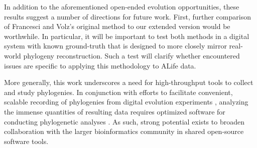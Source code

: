 In addition to the aforementioned open-ended evolution opportunities, these results suggest a number of directions for future work.
First, further comparison of Francesci and Volz's original method to our extended version would be worthwhile.
In particular, it will be important to test both methods in a digital system with known ground-truth that is designed to more closely mirror real-world phylogeny reconstruction.
Such a test will clarify whether encountered issues are specific to applying this methodology to ALife data.

More generally, this work underscores a need for high-throughput tools to collect and study phylogenies.
In conjunction with efforts to facilitate convenient, scalable recording of phylogenies from digital evolution experiments \citep{dolson2024phylotrack,lalejini2019data,moreno2022hstrat,godin-duboisAPOGeTAutomatedPhylogeny2024}, analyzing the immense quantities of resulting data requires optimized software for conducting phylogenetic analyses \citep{moshiriCompactTreeLightweightHeaderonly2025}.
As such, strong potential exists to broaden collaboration with the larger bioinformatics community in shared open-source software tools.


